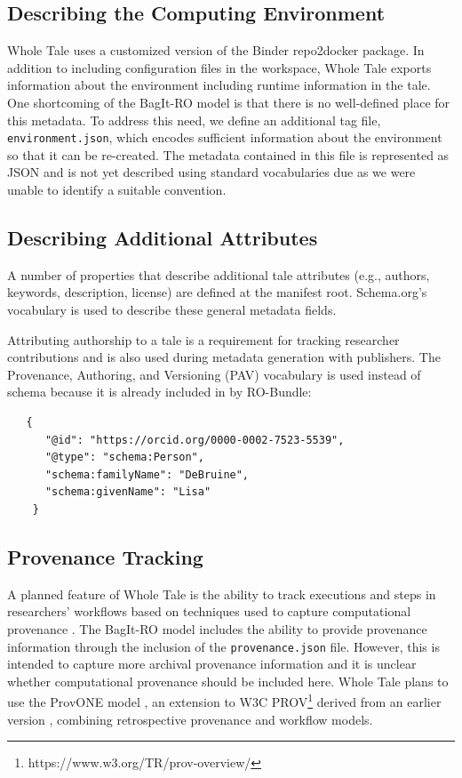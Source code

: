 \documentclass[conference]{IEEEtran}
\begin{document}
\subsection{Describing the Computing Environment}
Whole Tale uses a customized version of the Binder repo2docker package. In addition to including configuration files in the workspace, Whole Tale exports information about the environment including runtime information in the tale. One shortcoming of the BagIt-RO model is that there is no well-defined place for this metadata. To address this need, we define an additional tag file, \texttt{environment.json}, which encodes sufficient information about the environment  so that it can be re-created. The metadata contained in this file is represented as JSON and is not yet described using standard vocabularies due as we were unable to identify a suitable convention.

\subsection{Describing Additional Attributes}
A number of properties that describe additional tale attributes (e.g., authors, keywords, description, license) are defined at the manifest root. Schema.org's vocabulary is used to describe these general metadata fields.

Attributing authorship to a tale is a requirement for tracking researcher contributions and is also used during metadata generation with publishers. The Provenance, Authoring, and Versioning (PAV) vocabulary is used instead of schema because it is already included in by RO-Bundle: 

\begin{lstlisting}
   {
      "@id": "https://orcid.org/0000-0002-7523-5539",
      "@type": "schema:Person",
      "schema:familyName": "DeBruine",
      "schema:givenName": "Lisa"
    }
\end{lstlisting}
		
		
\subsection{Provenance Tracking}

A planned feature of Whole Tale is the ability to track executions and
steps in researchers' workflows based on techniques used to capture
computational provenance
\cite{mcphillips2015retrospective,Chirigati2016,That2017,Yuan2018}. 
The BagIt-RO model includes the ability to provide provenance
information through the inclusion of the \texttt{provenance.json}
file. However, this is intended to capture more archival provenance
information and it is unclear whether computational provenance should
be included here. 
Whole Tale plans to use the ProvONE model \cite {ProvONE}, an
extension to W3C
PROV\footnote{https://www.w3.org/TR/prov-overview/} derived from
an earlier version \cite{missier2013dprov}, combining retrospective
provenance and workflow models.
\end{document}
